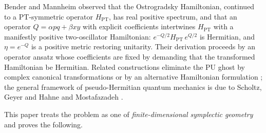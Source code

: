 \documentclass[11pt]{article}
\theoremstyle{definition}
\theoremstyle{remark}
\begin{document}
Bender and Mannheim \cite{BM2008PRL,BM2008PRD} observed that the Ostrogradsky
Hamiltonian, continued to a PT-symmetric operator $H_{\mathrm{PT}}$, has real
positive spectrum, and that an operator $Q=\alpha pq+\beta xy$ with explicit
coefficients intertwines $H_{\mathrm{PT}}$ with a manifestly positive
two-oscillator Hamiltonian: $e^{-Q/2}H_{\mathrm{PT}}\,e^{Q/2}$ is Hermitian,
and $\eta=e^{-Q}$ is a positive metric restoring unitarity.  Their derivation
proceeds by an operator ansatz whose coefficients are fixed by demanding that
the transformed Hamiltonian be Hermitian.  Related constructions eliminate
the PU ghost by complex canonical transformations \cite{Dector2009} or by an
alternative Hamiltonian formulation \cite{Mostafazadeh2010PU}; the general
framework of pseudo-Hermitian quantum mechanics is due to Scholtz, Geyer and
Hahne \cite{SGH1992} and Mostafazadeh \cite{Mostafazadeh2002,Mostafazadeh2010}.

This paper treats the problem as one of \emph{finite-dimensional symplectic
geometry} and proves the following.
\end{document}
